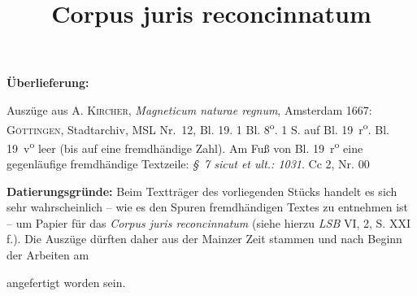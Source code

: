\begin{ledgroupsized}[r]{120mm}%
\footnotesize%
\pstart%
\noindent\textbf{\"{U}berlieferung:}%
\pend%
\end{ledgroupsized}%
\begin{ledgroupsized}[r]{114mm}%
\footnotesize%
\pstart%
\parindent -6mm%
%
Auszüge aus \cite{01081}\textsc{A. Kircher}, \textit{Magneticum naturae regnum}, Amsterdam 1667:
\textsc{Göttingen}, Stadtarchiv, MSL Nr.~12,
 Bl. 19.
1 Bl. 8\textsuperscript{o}. 1 S. auf Bl. 19~r\textsuperscript{o}. Bl. 19~v\textsuperscript{o} leer (bis auf eine fremdhändige Zahl).
Am Fuß von Bl. 19~r\textsuperscript{o} eine gegenläufige fremdhändige Textzeile: \textit{§~7 sicut et ult.: 1031}.%
\newline%
Cc 2, Nr. 00%
\pend%
\end{ledgroupsized}%
%
\vspace*{5mm}%
\begin{ledgroup}%
\footnotesize%
\pstart%
\noindent%
\footnotesize{%
\textbf{Datierungsgr\"{u}nde:}
Beim Textträger des vorliegenden Stücks handelt es sich sehr wahrscheinlich -- wie es den Spuren fremdhändigen Textes zu entnehmen ist -- um Papier für das \textit{Corpus juris reconcinnatum} (siehe hierzu \textit{LSB} VI, 2, S. XXI\,f.).
Die Auszüge dürften daher aus der Mainzer Zeit stammen und nach Beginn der Arbeiten am \title{Corpus juris reconcinnatum} angefertigt worden sein.%
}%
\pend%
\end{ledgroup}%
%
%
\vspace*{8mm}%
\count{}
\count{}
\count{}
\pstart%
\normalsize%
\noindent%
[19~r\textsuperscript{o}] 
%
